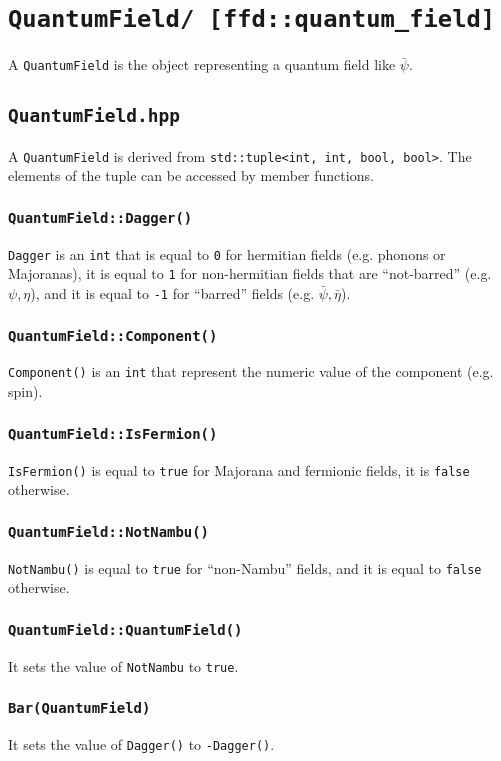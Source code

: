 \chapter{\texttt{QuantumField/ [ffd::quantum\_field]}}
A \texttt{QuantumField} is the object representing a quantum field like $\bar{\psi}$.
\section{\texttt{QuantumField.hpp}}
A \texttt{QuantumField} is derived from \texttt{std::tuple<int, int, bool, bool>}. The elements of the tuple can be accessed by member functions.
\subsection{\texttt{QuantumField::Dagger()}}
\texttt{Dagger} is an \texttt{int} that is equal to \texttt{0} for hermitian fields (e.g. phonons or Majoranas), it is equal to \texttt{1} for non-hermitian fields that are ``not-barred'' (e.g. $\psi,\eta$), and it is equal to \texttt{-1} for ``barred'' fields (e.g. $\bar{\psi}, \bar{\eta}$).
\subsection{\texttt{QuantumField::Component()}}
\texttt{Component()} is an \texttt{int} that represent the numeric value of the component (e.g. spin).
\subsection{\texttt{QuantumField::IsFermion()}}
\texttt{IsFermion()} is equal to \texttt{true} for Majorana and fermionic fields, it is \texttt{false} otherwise.
\subsection{\texttt{QuantumField::NotNambu()}}
\texttt{NotNambu()} is equal to \texttt{true} for ``non-Nambu'' fields, and it is equal to \texttt{false} otherwise.
\subsection{\texttt{QuantumField::QuantumField()}}
It sets the value of \texttt{NotNambu} to \texttt{true}.
\subsection{\texttt{Bar(QuantumField)}}
It sets the value of \texttt{Dagger()} to \texttt{-Dagger()}.
